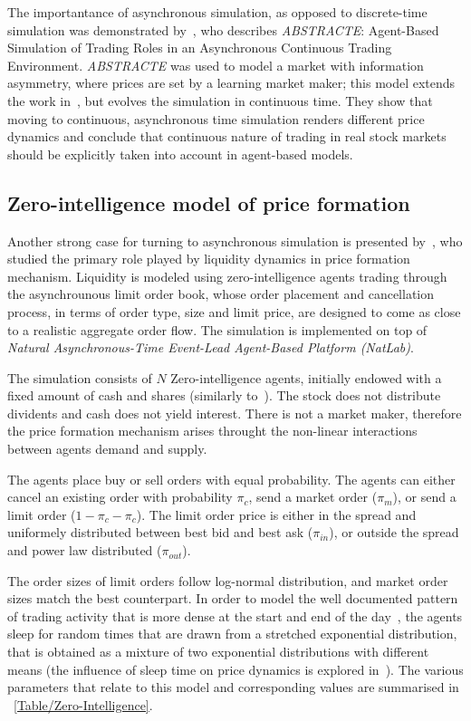 The importantance of asynchronous simulation, as opposed to discrete-time simulation was demonstrated by~\citet{Sorban2008}, who describes \textit{ABSTRACTE}: Agent-Based Simulation of Trading Roles in an Asynchronous Continuous Trading Environment. \textit{ABSTRACTE} was used to model a market with information asymmetry, where prices are set by a learning market maker; this model extends the work in~\citep{Das2006}, but evolves the simulation in continuous time. They show that moving to continuous, asynchronous time simulation renders different price dynamics and conclude that continuous nature of trading in real stock markets should be explicitly taken into account in agent-based models.

\subsection{Zero-intelligence model of price formation}

Another strong case for turning to asynchronous simulation is presented by~\citet[chap.~4]{Gilles2006}, who studied the primary role played by liquidity dynamics in price formation mechanism. Liquidity is modeled using zero-intelligence agents trading through the asynchrounous limit order book, whose order placement and cancellation process, in terms of order type, size and limit price, are designed to come as close to a realistic aggregate order flow. The simulation is implemented on top of \textit{Natural Asynchronous-Time Event-Lead Agent-Based Platform (NatLab)}.  

The simulation consists of $N$ Zero-intelligence agents, initially endowed with a fixed amount of cash and shares (similarly to~\cite{Raberto2001}). The stock does not distribute dividents and cash does not yield interest. There is not a market maker, therefore the price formation mechanism arises throught the non-linear interactions between agents demand and supply.

The agents place buy or sell orders with equal probability. The agents can either cancel an existing order with probability $\pi_c$, send a market order ($\pi_m$), or send a limit order ($1-\pi_c-\pi_c$). The limit order price is either in the spread and uniformely distributed between best bid and best ask ($\pi_{in}$), or outside the spread and power law distributed ($\pi_{out}$).

The order sizes of limit orders follow log-normal distribution, and market order sizes match the best counterpart. In order to model the well documented pattern of trading activity that is more dense at the start and end of the day~\cite{Clark1973}, the agents sleep for random times that are drawn from a stretched exponential distribution, that is obtained as a mixture of two exponential distributions with different means (the influence of sleep time on price dynamics is explored in~\cite{Scalas2004}). The various parameters that relate to this model and corresponding values are summarised in \tableautorefname~\ref{Table/Zero-Intelligence}.

